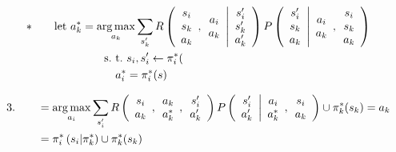 \begin{align*}
\ast\qquad \text{let\ }a_k^\ast & = \operatorname*{arg\,max}_{a_k}\sum_{s^\prime_k}  R\left(  \begin{array}{c} s_i \\ s_k \\ a_k \end{array},\begin{array}{c} a_i \\ a_k \end{array}
\middle| 
\begin{array}{c} s^\prime_i \\ s^\prime_k \\ a^\prime_k \end{array}
\right)
P\left( 
\begin{array}{c} s^\prime_i \\ s_k \\ a_k \end{array}
\middle | \begin{array}{c} a_i \\ a_k \end{array},
\begin{array}{c} s_i \\ s_k \\ a_k \end{array}
\right)\\
& \qquad\text{s.\ t.\ }s_i,s^\prime_i\leftarrow\pi^\ast_i( \\
&\qquad\quad a^\ast_i = \pi^\ast_i(s)
\end{align*}

\begin{align*}
3.\qquad &= \operatorname*{arg\,max}_{a_i}\sum_{s^\prime_i}
 R\left(  \begin{array}{c} s_i \\ a_k \end{array},
\begin{array}{c} a_k \\ a^\ast_k \end{array},
\begin{array}{c} s^\prime_i \\  a^\prime_k \end{array}
\right)
P\left( 
\begin{array}{c} s^\prime_i \\ a^\prime_k \end{array}
\middle | \begin{array}{c} a_i \\ a^\ast_k \end{array},
\begin{array}{c} s_i \\ a_k \end{array}
\right)
\cup
\pi^\ast_k(s_k)=a_k \\
& = \pi^\ast_i\left( s_i \middle| \pi_k^\ast \right) \cup \pi^\ast_k(s_k)
\end{align*}